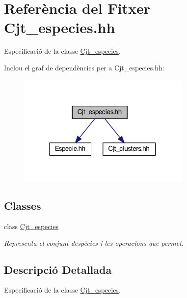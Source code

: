 \hypertarget{_cjt__especies_8hh}{}\section{Referència del Fitxer Cjt\+\_\+especies.\+hh}
\label{_cjt__especies_8hh}


Especificació de la classe \hyperlink{class_cjt__especies}{Cjt\+\_\+especies}.  


Inclou el graf de dependències per a Cjt\+\_\+especies.\+hh\+:\nopagebreak
\begin{figure}[H]
\begin{center}
\leavevmode
\includegraphics[width=242pt]{_cjt__especies_8hh__incl}
\end{center}
\end{figure}
\subsection*{Classes}
\begin{DoxyCompactItemize}
\item 
class \hyperlink{class_cjt__especies}{Cjt\+\_\+especies}
\begin{DoxyCompactList}\small\item\em Representa el conjunt d\textquotesingle{}espècies i les operacions que permet. \end{DoxyCompactList}\end{DoxyCompactItemize}


\subsection{Descripció Detallada}
Especificació de la classe \hyperlink{class_cjt__especies}{Cjt\+\_\+especies}. 

